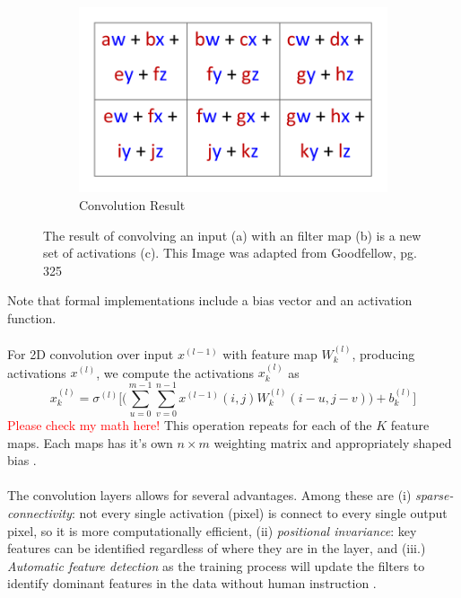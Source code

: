 \documentclass[12pt,letterpaper]{article}
\begin{document}
\begin{figure}[H]
\begin{center}
	\begin{subfigure}{0.9\textwidth}
	\centering
	\includegraphics[scale=0.6]{../figures/2DConvExample(c)}
	\caption{Convolution Result}
	\end{subfigure}
	
\end{center}
\caption{The result of convolving an input (a) with an filter map (b) is a new set of activations (c). This Image was adapted from Goodfellow, pg. 325 \cite{Goodfellow}}
\label{fig-2DConvExample}
\end{figure}
Note that formal implementations include a bias vector and an activation function.

\paragraph*{}For 2D convolution over input $x^{(l-1)}$ with feature map $W^{(l)}_k$, producing activations $x^{(l)}$, we compute the activations $x^{(l)}_{k}$ as \cite{Goodfellow}
\begin{equation}
\label{eqn-ConvFeedForward}
x^{(l)}_k = \sigma^{(l)}\bigg[ \Big( \sum_{u=0}^{m-1} \sum_{v=0}^{n-1} x^{(l-1)}(i,j) W^{(l)}_k(i - u,j - v) \Big) + b^{(l)}_k \bigg]
\end{equation}
\textcolor{red}{Please check my math here!}
This operation repeats for each of the $K$ feature maps. Each maps has it's own $n \times m$ weighting matrix and appropriately shaped bias .

\paragraph*{}The convolution layers allows for several advantages. Among these are (i) \textit{sparse-connectivity}: not every single activation (pixel) is connect to every single output pixel, so it is more computationally efficient, (ii) \textit{positional invariance}: key features can be identified regardless of where they are in the layer, and (iii.) \textit{Automatic feature detection} as the training process will update the filters to identify dominant features in the data without human instruction \cite{Geron,Goodfellow,Loy}.
\end{document}
